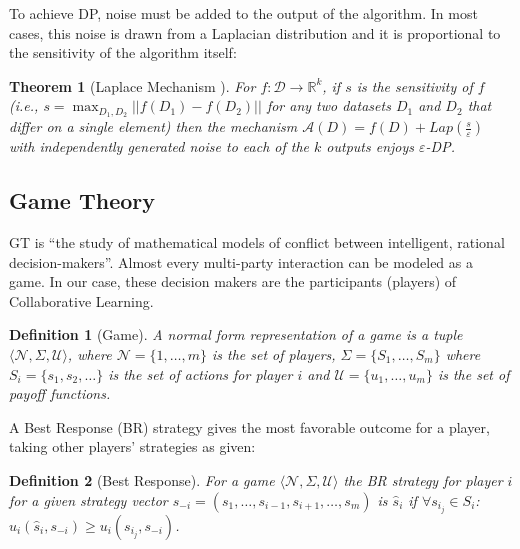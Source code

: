 \documentclass[USenglish,oneside,twocolumn]{article}
\theoremstyle{plain}
\newtheorem*{theorem*}{Theorem}
\newtheorem*{definition*}{Definition}
\begin{document}
    To achieve DP, noise must be added to the output of the algorithm. In most cases, this noise is drawn from a Laplacian distribution and it is proportional to the sensitivity of the algorithm itself:
    
    \vspace{-0.25cm}
    \begin{theorem*}[Laplace Mechanism \cite{dwork2006calibrating}]
        For $f:\mathcal{D}\rightarrow\mathbb{R}^k$, if $s$ is the sensitivity of $f$ (i.e., $s=\max_{D_1,D_2}||f(D_1)-f(D_2)||$ for any two datasets $D_1$ and $D_2$ that differ on a single element) then the mechanism $\mathcal{A}(D)=f(D)+Lap(\frac{s}{\varepsilon})$ with independently generated noise to each of the $k$ outputs enjoys $\varepsilon$-DP.
    \end{theorem*}
    \vspace{-0.25cm}
    
    \vspace{-0.5cm}
    \subsection{Game Theory}
    \vspace{-0.25cm}
    
    GT \cite{harsanyi1988general} is ``the study of mathematical models of conflict between intelligent, rational decision-makers''. Almost every multi-party interaction can be modeled as a game. In our case, these decision makers are the participants (players) of Collaborative Learning.
    
    \vspace{-0.25cm}
    \begin{definition*}[Game]
        A normal form representation of a game is a tuple $\langle\mathcal{N},\Sigma,\mathcal{U}\rangle$, where $\mathcal{N}=\{1,\dots,m\}$ is the set of players, $\Sigma=\{S_1,\dots,S_m\}$ where $S_i=\{s_1,s_2,\dots\}$ is the set of actions for player $i$ and $\mathcal{U}=\{u_1,\dots,u_m\}$ is the set of payoff functions.
    \end{definition*}
    \vspace{-0.25cm}
    
    A Best Response (BR) strategy gives the most favorable outcome for a player, taking other players' strategies as given:
    
    \vspace{-0.25cm}
    \begin{definition*}[Best Response]
        For a game $\langle\mathcal{N},\Sigma,\mathcal{U}\rangle$ the BR strategy for player $i$ for a given strategy vector $s_{-i}=(s_1,\dots,s_{i-1},s_{i+1},\dots,s_m)$ is $\hat{s}_i$ if $\forall s_{i_j}\in S_i$: $u_i(\hat{s}_i,s_{-i})\geq u_i(s_{i_j},s_{-i})$.
    \end{definition*}
    \vspace{-0.25cm}
    
\end{document}
